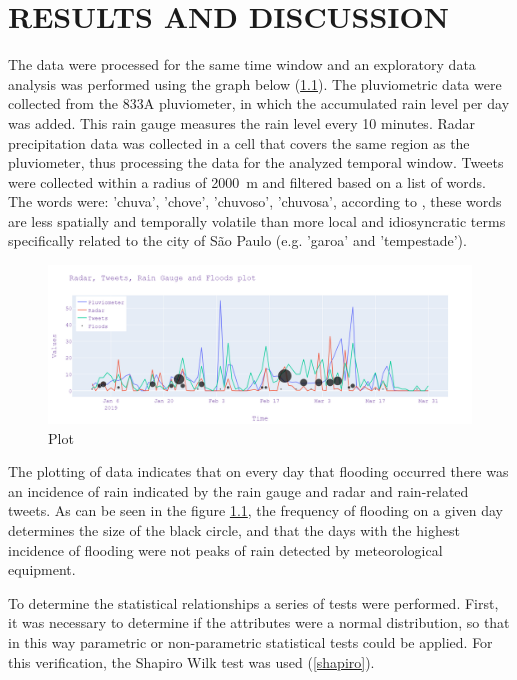 
\chapter{RESULTS AND DISCUSSION} \label{MatMet}

The data were processed for the same time window and an exploratory data analysis was performed using the graph below (\ref{fig:graph}). The pluviometric data were collected from the 833A pluviometer, in which the accumulated rain level per day was added. This rain gauge measures the rain level  every 10 minutes. Radar precipitation data was collected in a cell that covers the same region as the pluviometer, thus processing the data for the analyzed temporal window. Tweets were collected within a radius of \si{2000 \meter} and filtered based on a list of words. The words were: 'chuva', 'chove', 'chuvoso', 'chuvosa', according to \cite{de2021effect}, these words are less spatially and temporally volatile than more local and idiosyncratic terms specifically related to the city of São Paulo (e.g. 'garoa' and 'tempestade'). 

\begin{figure}[H]
	\centering
	\includegraphics[width=1.2\textwidth]{figs/newplot.png}
	\caption{Plot}
	\label{fig:graph}
\end{figure}

The plotting of data indicates that on every day that flooding occurred there was an incidence of rain indicated by the rain gauge and radar and rain-related tweets. As can be seen in the figure \ref{fig:graph}, the frequency of flooding on a given day determines the size of the black circle, and that the days with the highest incidence of flooding were not peaks of rain detected by meteorological equipment.

To determine the statistical relationships a series of tests were performed. First, it was necessary to determine if the attributes were a normal distribution, so that in this way parametric or non-parametric statistical tests could be applied. For this verification, the Shapiro Wilk test was used (\ref{shapiro}).


